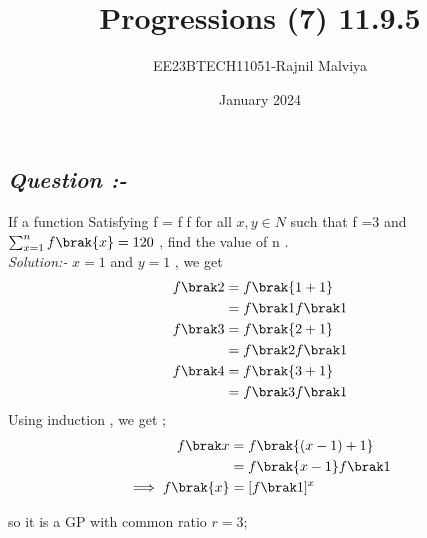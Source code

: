 \documentclass[journal,12pt,twocolumn]{IEEEtran}
\theoremstyle{remark}
\begin{document}
\title{Progressions (7) 11.9.5}
\author{EE23BTECH11051-Rajnil Malviya}
\date{January 2024}
\maketitle
\subsection*{\textit{Question :-}}
If a function Satisfying f = f f for all $x,y \in {N}$ such that f =3 and $\sum_{x=1}^{n} f\brak{x} = 120$ , find the value of n .\\
\textit{Solution:- }
  $x=1$ and $y=1$ , we get
\begin{align}
    f\brak2&=f\brak{1+1}\\
     &={f\brak1} f\brak 1\\
      f\brak3&=f\brak{2+1} \\
  &    ={f\brak2} f\brak 1\\
        f\brak4&=f\brak{3+1}\\
        & ={f\brak3} f\brak 1
        \end{align}
        Using induction , we get ;
       \begin{align}
           f\brak x&=f\brak{(x-1)+1} \\
           &={f\brak{x-1}} f\brak 1\\
           \implies f\brak{x }&=[f\brak 1]^x
       \end{align}
       


so it is a GP with common ratio $r=3 ;$


\begin{table}[h!]
            
    \end{table}
\end{document}
